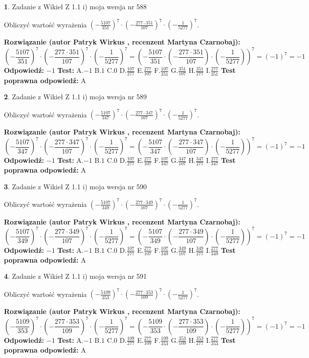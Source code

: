 \documentclass[12pt, a4paper]{article}
\theoremstyle{definition} %
\newtheorem{zad}{}
\newcommand{\zadStart}[1]{\begin{zad}#1\newline}
\newcommand{\zadStop}{\end{zad}}
\newcommand{\rozwStart}[2]{\noindent \textbf{Rozwiązanie (autor #1 , recenzent #2): }\newline}
\newcommand{\rozwStop}{\newline}
\newcommand{\odpStart}{\noindent \textbf{Odpowiedź:}\newline}
\newcommand{\odpStop}{\newline}
\newcommand{\testStart}{\noindent \textbf{Test:}\newline}
\newcommand{\testStop}{\newline}
\newcommand{\kluczStart}{\noindent \textbf{Test poprawna odpowiedź:}\newline}
\newcommand{\kluczStop}{\newline}
\begin{document}
\zadStart{Zadanie z Wikieł Z 1.1 i) moja wersja nr 588}

Obliczyć wartość wyrażenia $(-\frac{5107}{351})^{7} \cdot (-\frac{277 \cdot 351}{107})^{7} \cdot (-\frac{1}{5277})^{7}$.
\zadStop
\rozwStart{Patryk Wirkus}{Martyna Czarnobaj}
$$(-\frac{5107}{351})^{7} \cdot (-\frac{277 \cdot 351}{107})^{7} \cdot (-\frac{1}{5277})^{7} = (-\frac{5107}{351} \cdot (-\frac{277 \cdot 351}{107}) \cdot (-\frac{1}{5277}))^{7} = (-1)^{7} = -1$$
\rozwStop
\odpStart
$-1$
\odpStop
\testStart
A.$-1$ B.$1$ C.$0$ D.$\frac{107}{277}$ E.$\frac{277}{107}$
F.$\frac{107}{351}$ G.$\frac{351}{107}$
H.$\frac{351}{277}$
I.$\frac{277}{351}$
\testStop
\kluczStart
A
\kluczStop



\zadStart{Zadanie z Wikieł Z 1.1 i) moja wersja nr 589}

Obliczyć wartość wyrażenia $(-\frac{5107}{347})^{7} \cdot (-\frac{277 \cdot 347}{107})^{7} \cdot (-\frac{1}{5277})^{7}$.
\zadStop
\rozwStart{Patryk Wirkus}{Martyna Czarnobaj}
$$(-\frac{5107}{347})^{7} \cdot (-\frac{277 \cdot 347}{107})^{7} \cdot (-\frac{1}{5277})^{7} = (-\frac{5107}{347} \cdot (-\frac{277 \cdot 347}{107}) \cdot (-\frac{1}{5277}))^{7} = (-1)^{7} = -1$$
\rozwStop
\odpStart
$-1$
\odpStop
\testStart
A.$-1$ B.$1$ C.$0$ D.$\frac{107}{277}$ E.$\frac{277}{107}$
F.$\frac{107}{347}$ G.$\frac{347}{107}$
H.$\frac{347}{277}$
I.$\frac{277}{347}$
\testStop
\kluczStart
A
\kluczStop



\zadStart{Zadanie z Wikieł Z 1.1 i) moja wersja nr 590}

Obliczyć wartość wyrażenia $(-\frac{5107}{349})^{7} \cdot (-\frac{277 \cdot 349}{107})^{7} \cdot (-\frac{1}{5277})^{7}$.
\zadStop
\rozwStart{Patryk Wirkus}{Martyna Czarnobaj}
$$(-\frac{5107}{349})^{7} \cdot (-\frac{277 \cdot 349}{107})^{7} \cdot (-\frac{1}{5277})^{7} = (-\frac{5107}{349} \cdot (-\frac{277 \cdot 349}{107}) \cdot (-\frac{1}{5277}))^{7} = (-1)^{7} = -1$$
\rozwStop
\odpStart
$-1$
\odpStop
\testStart
A.$-1$ B.$1$ C.$0$ D.$\frac{107}{277}$ E.$\frac{277}{107}$
F.$\frac{107}{349}$ G.$\frac{349}{107}$
H.$\frac{349}{277}$
I.$\frac{277}{349}$
\testStop
\kluczStart
A
\kluczStop



\zadStart{Zadanie z Wikieł Z 1.1 i) moja wersja nr 591}

Obliczyć wartość wyrażenia $(-\frac{5109}{353})^{7} \cdot (-\frac{277 \cdot 353}{109})^{7} \cdot (-\frac{1}{5277})^{7}$.
\zadStop
\rozwStart{Patryk Wirkus}{Martyna Czarnobaj}
$$(-\frac{5109}{353})^{7} \cdot (-\frac{277 \cdot 353}{109})^{7} \cdot (-\frac{1}{5277})^{7} = (-\frac{5109}{353} \cdot (-\frac{277 \cdot 353}{109}) \cdot (-\frac{1}{5277}))^{7} = (-1)^{7} = -1$$
\rozwStop
\odpStart
$-1$
\odpStop
\testStart
A.$-1$ B.$1$ C.$0$ D.$\frac{109}{277}$ E.$\frac{277}{109}$
F.$\frac{109}{353}$ G.$\frac{353}{109}$
H.$\frac{353}{277}$
I.$\frac{277}{353}$
\testStop
\kluczStart
A
\kluczStop
\end{document}
